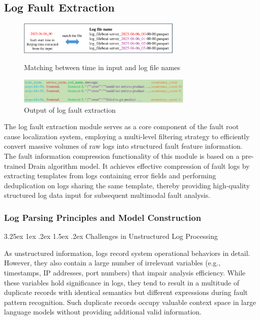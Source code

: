 \documentclass[10pt]{article}
\makeatletter
\renewcommand{\paragraph}{%
    \@startsection{paragraph}{4}{\z@}%
    {3.25ex \@plus1ex \@minus.2ex}%
    {1.5ex \@plus.2ex}%
    {\normalfont\normalsize\itshape}%
}
\makeatother
\begin{document}
\subsection{Log Fault Extraction}

\begin{figure}[htbp]
    \centering
    \includegraphics[width=0.7\textwidth]{pics/fig7.pdf}
    \caption{Matching between time in input and log file names}
    \label{fig7}

    \vspace{10pt}
    \includegraphics[width=0.75\textwidth]{pics/fig8.pdf}
    \caption{Output of log fault extraction}
    \label{fig8}
\end{figure}

The log fault extraction module serves as a core component of the fault root cause localization system, employing a multi-level filtering strategy to efficiently convert massive volumes of raw logs into structured fault feature information. The fault information compression functionality of this module is based on a pre-trained Drain algorithm model. It achieves effective compression of fault logs by extracting templates from logs containing error fields and performing deduplication on logs sharing the same template, thereby providing high-quality structured log data input for subsequent multimodal fault analysis.

\subsubsection{Log Parsing Principles and Model Construction}

\paragraph{Challenges in Unstructured Log Processing}

As unstructured information, logs record system operational behaviors in detail. However, they also contain a large number of irrelevant variables (e.g., timestamps, IP addresses, port numbers) that impair analysis efficiency. While these variables hold significance in logs, they tend to result in a multitude of duplicate records with identical semantics but different expressions during fault pattern recognition. Such duplicate records occupy valuable context space in large language models without providing additional valid information.
\end{document}
